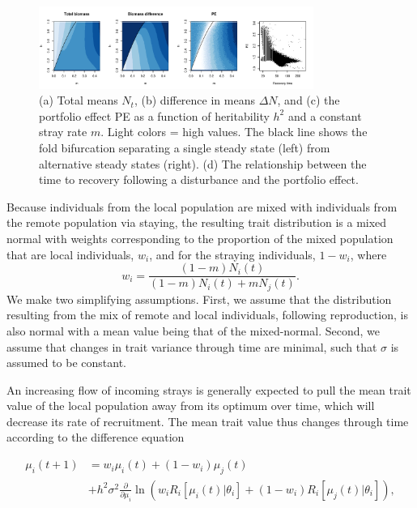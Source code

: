 \documentclass[twocolumn,preprintnumbers,amsmath,amssymb,superscriptaddress]{revtex4}
\begin{document}
\begin{figure}
  \captionsetup{justification=raggedright,
singlelinecheck=false
}
\centering
\includegraphics[width=0.8\textwidth]{figs2/fig_MDPE_hm.pdf}
\caption{
(a) Total means $N_t$, (b) difference in means $\Delta N$, and (c) the portfolio effect PE as a function of heritability $h^2$ and a constant stray rate $m$. Light colors = high values.
The black line shows the fold bifurcation separating a single steady state (left) from alternative steady states (right).
(d) The relationship between the time to recovery following a disturbance and the portfolio effect.
} \label{fig:PE}
\end{figure}

\noindent Because individuals from the local population are mixed with individuals from the remote population via staying, the resulting trait distribution is a mixed normal with weights corresponding to the proportion of the mixed population that are local individuals, $w_i$, and for the straying individuals, $1-w_i$, where 
\begin{equation}
w_i=\frac{(1-m)N_i(t)}{(1-m) N_i(t) + m N_j(t)}.
\end{equation}
We make two simplifying assumptions.
First, we assume that the distribution resulting from the mix of remote and local individuals, following reproduction, is also normal with a mean value being that of the mixed-normal.
Second, we assume that changes in trait variance through time are minimal, such that $\sigma$ is assumed to be constant.



An increasing flow of incoming strays is generally expected to pull the mean trait value of the local population away from its optimum over time, which will decrease its rate of recruitment.
The mean trait value thus changes through time according to the difference equation

\begin{align}
  \mu_i(t+1) &= w_i\mu_i(t) + (1-w_i)\mu_j(t) \\ \nonumber
  &+ h^2\sigma^2\frac{\partial}{\partial \mu_i}\ln\left(w_i R_i[\mu_i(t)|\theta_i] + (1-w_i)R_i[\mu_j(t)|\theta_i]  \right),
  \label{eq:mu}
\end{align}
\end{document}
